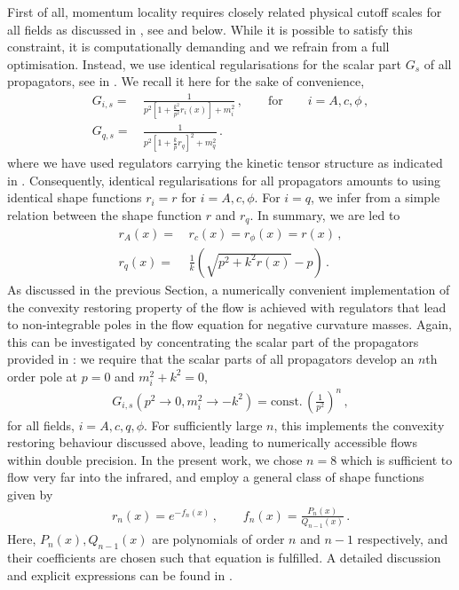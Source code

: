 \documentclass[aps,twocolumn,prd,superscriptaddress]{revtex4-2}
\begin{document}
First of all, momentum locality requires closely related physical cutoff scales for all fields as discussed in , see  and below. While it is possible to satisfy this constraint, it is computationally demanding and we refrain from a full optimisation. Instead, we use identical regularisations for the scalar part $G_s$ of all propagators, see  in . We recall it here for the sake of convenience, 
%
\begin{align}\nonumber 
	G_{i,s} =&\, \frac{1}{p^2\left[1 + \frac{k^2}{p^2} r_i(x)\right] + m^2_{i} }\,,\qquad \textrm{for}\qquad i= A,c,\phi\,,\\[1ex] 
	G_{q,s} = &\, \frac{1}{ p^2\left[1 + \frac{k}{p} r_q\right]^2 + m^2_q }\,.
	\label{eq:ScalarPropMain}
\end{align}
%
where we have used regulators carrying the kinetic tensor structure as indicated in . Consequently, identical regularisations for all propagators amounts to using identical shape functions $r_i=r$ for $i=A,c,\phi$. For $i=q$, we infer from	 a simple relation between the shape function $r$ and $r_q$. In summary, we are led to 
%
\begin{align}\nonumber 
	r_A(x)=&\,r_c(x)=r_\phi(x)= r(x)\,,\\[1ex] 
	r_q(x) = &\,\frac{1}{k} \left( \sqrt{p^2 +k^2 r(x)} -p\right) \,.
	\label{eq:rPhiEqualMain}
\end{align}
%
As discussed in the previous Section, a numerically convenient implementation of the convexity restoring property \cite{Litim:2006nn} of the flow is achieved with regulators that lead to non-integrable poles in the flow equation for negative curvature masses. Again, this can be investigated by concentrating the scalar part of the propagators provided in : we require that the scalar parts  of all propagators develop an $n$th order pole at $p=0$ and $m^2_i + k^2 = 0$, 
%
\begin{align}
	G_{i,s}(p^2\to 0,m^2_i\to -k^2) = \textrm{const.} \,\left(\frac{1}{p^2}\right)^n\,, 
	\label{eq:GsSingn} 
\end{align}
% 
for all fields, $i=A,c,q,\phi$. For sufficiently large $n$, this implements the convexity restoring behaviour discussed above, leading to numerically accessible flows within double precision. In the present work, we chose $n=8$ which is sufficient to flow very far into the infrared, and employ a general class of shape functions given by
%
\begin{align}
	r_n(x) = e^{-f_n(x)}\,, \qquad f_n(x) = \frac{P_n(x)}{Q_{n-1}(x)}\,.
	\label{eq:RationalExpShapeMain}
\end{align}
%
Here, $P_n(x), Q_{n-1}(x)$ are polynomials of order $n$ and $n-1$ respectively, and their coefficients are chosen such that equation  is fulfilled. A detailed discussion and explicit expressions can be found in .
\end{document}
